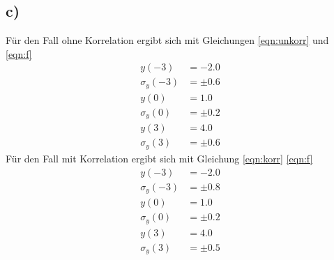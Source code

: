 \subsection{c)}
\label{subsec:a4c}
Für den Fall ohne Korrelation ergibt sich
mit Gleichungen \ref{eqn:unkorr} und \ref{eqn:f}
\\
\begin{align*}
  y(-3) &= \SI{-2.0}{}\\
  \sigma_{y}(-3) &= \pm 0.6\\
  y(0) &= \SI{1.0}{}  \\
  \sigma_{y}(0) &= \pm0.2\\
  y(3) &= \SI{4.0}{} \\
  \sigma_{y}(3) &= \pm0.6
\end{align*}
Für den Fall mit Korrelation ergibt sich mit
Gleichung \ref{eqn:korr} \ref{eqn:f}
\\
\begin{align*}
  y(-3) &= \SI{-2.0}{}\\
  \sigma_{y}(-3) &= \pm0.8\\
  y(0) &= \SI{1.0}{}  \\
  \sigma_{y}(0) &= \pm0.2\\
  y(3) &= \SI{4.0}{} \\
  \sigma_{y}(3) &= \pm0.5
\end{align*}
